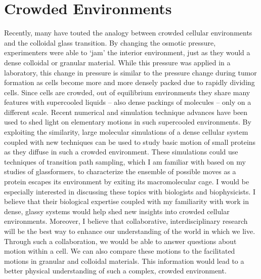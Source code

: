 \documentclass[11pt]{article}
\begin{document}
\section{Crowded Environments}
Recently, many have touted the analogy between crowded cellular environments and the colloidal glass transition.  By changing the osmotic pressure, experimenters were able to `jam' the interior environment, just as they would a dense colloidal or granular material.  While this pressure was applied in a laboratory, this change in pressure is similar to the pressure change during tumor formation as cells become more and more densely packed due to rapidly dividing cells.  Since cells are crowded, out of equilibrium environments they share many features with supercooled liquids -- also dense packings of molecules -- only on a different scale.  Recent numerical and simulation technique advances have been used to shed light on elementary motions in such supercooled environments.  By exploiting the similarity, large molecular simulations of a dense cellular system coupled with new techniques can be used to study basic motion of small proteins as they diffuse in such a crowded environment.  These simulations could use techniques of transition path sampling, which I am familiar with based on my studies of glassformers, to characterize the ensemble of possible moves as a protein escapes its environment by exiting its macromolecular cage.  I would be especially interested in discussing these topics with biologists and biophysicists.  I believe that their biological expertise coupled with my familiarity with work in dense, glassy systems would help shed new insights into crowded cellular environments.  Moreover, I believe that collaborative, interdisciplinary research will be the best way to enhance our understanding of the world in which we live.  Through such a collaboration, we would be able to answer questions about motion within a cell.  We can also compare these motions to the facilitated motions in granular and colloidal materials.  This information would lead to a better physical understanding of such a complex, crowded environment.   
\end{document}
